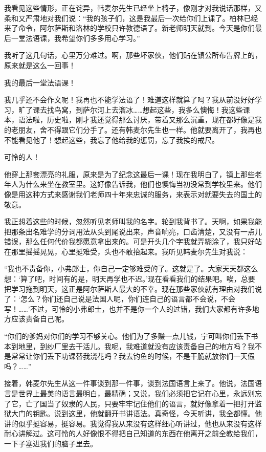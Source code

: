 \documentclass[12pt,UTF-8,openany]{ctexbook}
\begin{document}
\begin{large}
    我看见这些情形，正在诧异，韩麦尔先生已经坐上椅子，像刚才对我说话那样，又柔和又严肃地对我们说：“我的孩子们，这是我最后一次给你们上课了。柏林已经来了命令，阿尔萨斯和洛林的学校只许教德语了。新老师明天就到。今天是你们最后一堂法语课，我希望你们多多用心学习。”
    
    我听了这几句话，心里万分难过。啊，那些坏家伙，他们贴在镇公所布告牌上的，原来就是这么一回事！
    
    我的最后一堂法语课！
    
    我几乎还不会作文呢！我再也不能学法语了！难道这样就算了吗？我从前没好好学习，旷了课去找鸟窝，到萨尔河上去溜冰……想起这些，我多么懊悔！我这些课本，语法啦，历史啦，刚才我还觉得那么讨厌，带着又那么沉重，现在都好像是我的老朋友，舍不得跟它们分手了。还有韩麦尔先生也一样。他就要离开了，我再也不能看见他了！想起这些，我忘了他给我的惩罚，忘了我挨的戒尺。
    
    可怜的人！
    
    他穿上那套漂亮的礼服，原来是为了纪念这最后一课！现在我明白了，镇上那些老年人为什么来坐在教室里。这好像告诉我，他们也懊悔当初没常到学校里来。他们像是用这种方式来感谢我们老师四十年来忠诚的服务，来表示对就要失去的国土的敬意。
    
    我正想着这些的时候，忽然听见老师叫我的名字。轮到我背书了。天啊，如果我能把那条出名难学的分词用法从头到尾说出来，声音响亮，口齿清楚，又没有一点儿错误，那么任何代价我都愿意拿出来的。可是开头几个字我就弄糊涂了，我只好站在那里摇摇晃晃，心里挺难受，头也不敢抬起来。我听见韩麦尔先生对我说：
    
    “我也不责备你，小弗郎士，你自己一定够难受的了。这就是了。大家天天都这么想：‘算了吧，时间有的是，明天再学也不迟。’现在看看我们的结果吧。唉，总要把学习拖到明天，这正是阿尔萨斯人最大的不幸。现在那些家伙就有理由对我们说了：‘怎么？你们还自己说是法国人呢，你们连自己的语言都不会说，不会写！……’不过，可怜的小弗郎士，也并不是你一个人的过错，我们大家都有许多地方应该责备自己呢。
    
    “你们的爹妈对你们的学习不够关心。他们为了多赚一点儿钱，宁可叫你们丢下书本到地里，到纱厂里去干活儿。我呢，我难道就没有应该责备自己的地方吗？我不是常常让你们丢下功课替我浇花吗？我去钓鱼的时候，不是干脆就放你们一天假吗？……”
    
    接着，韩麦尔先生从这一件事谈到那一件事，谈到法国语言上来了。他说，法国语言是世界上最美的语言最明白，最精确；又说，我们必须把它记在心里，永远别忘了它，亡了国当了奴隶的人民，只要牢牢记住他们的语言，就好像拿着一把打开监狱大门的钥匙。说到这里，他就翻开书讲语法。真奇怪，今天听讲，我全都懂。他讲的似乎挺容易，挺容易。我觉得我从来没有这样细心听讲过，他也从来没有这样耐心讲解过。这可怜的人好像恨不得把自己知道的东西在他离开之前全教给我们，一下子塞进我们的脑子里去。
    

\end{large}
\end{document}

